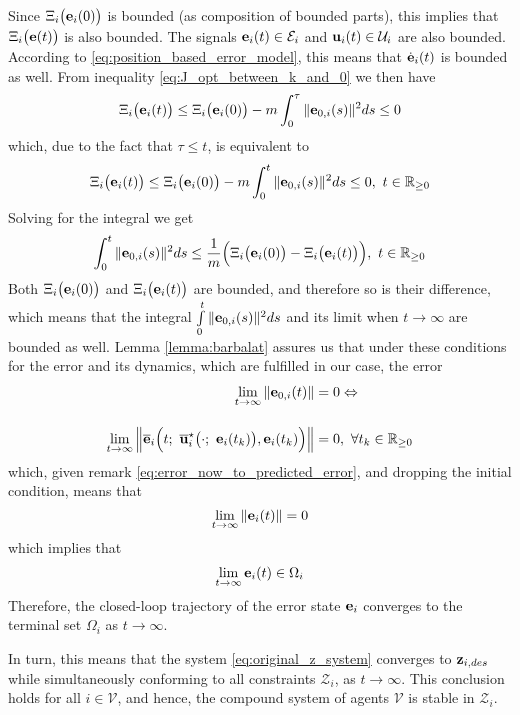 Since $\Xi_i\big(\bm{\mathbf{e}}_i(0)\big)$
is bounded (as composition of bounded parts), this implies
that $\Xi_i\big(\bm{\mathbf{e}}(t)\big)$ is also bounded. The signals
$\bm{\mathbf{e}}_i(t) \in \mathcal{E}_i$ and $\bm{\mathbf{u}}_i(t) \in \mathcal{U}_i$
are also bounded. According to \eqref{eq:position_based_error_model}, this
means that $\dot{\bm{\mathbf{e}}}_i(t)$ is bounded as well. From inequality
\eqref{eq:J_opt_between_k_and_0} we then have
\begin{align}
  \Xi_i\big(\bm{\mathbf{e}}_i(t)\big) \leq \Xi_i\big(\bm{\mathbf{e}}_i(0)\big)
    -m \int_{0}^{\tau} \|\bm{\mathbf{e}}_{0,i}(s)\|^2 ds \leq 0
\end{align}
which, due to the fact that $\tau \leq t$, is equivalent to
\begin{align}
  \Xi_i\big(\bm{\mathbf{e}}_i(t)\big) \leq \Xi_i\big(\bm{\mathbf{e}}_i(0)\big) -m \int_{0}^{t} \|\bm{\mathbf{e}}_{0,i}(s)\|^2 ds \leq 0,\ t \in \mathbb{R}_{\geq 0}
\end{align}
Solving for the integral we get
\begin{align}
  \int_{0}^{t} \|\bm{\mathbf{e}}_{0,i}(s)\|^2 ds \leq
    \dfrac{1}{m}\Big(\Xi_i\big(\bm{\mathbf{e}}_i(0)\big) - \Xi_i\big(\bm{\mathbf{e}}_i(t)\big)\Big),\ t \in \mathbb{R}_{\geq 0}
\end{align}
Both $\Xi_i\big(\bm{\mathbf{e}}_i(0)\big)$ and $\Xi_i\big(\bm{\mathbf{e}}_i(t)\big)$
are bounded, and therefore so is their difference, which means that the
integral $\int\limits_{0}^{t} \|\bm{\mathbf{e}}_{0,i}(s)\|^2 ds$ and its limit when
$t \to \infty$ are bounded as well. Lemma \eqref{lemma:barbalat} assures us
that under these conditions for the error and its dynamics, which are
fulfilled in our case, the error
\begin{align}
  \lim\limits_{t \to \infty}\|\vect{e}_{0,i}(t)\| &= 0 \Leftrightarrow \\[2.5ex]
  \lim\limits_{t \to \infty}
  \Big\| \overline{\vect{e}}_i\Big(t;\ \overline{\vect{u}}_i^{\star}\big(\cdot;\ \vect{e}_i(t_k)\big), \vect{e}_i(t_k) \Big) \Big\| &= 0,\
\forall t_k \in \mathbb{R}_{\geq 0}
\end{align}
which, given remark \eqref{eq:error_now_to_predicted_error},
and dropping the initial condition, means that
$$\lim\limits_{t \to \infty}\|\bm{\mathbf{e}}_i(t)\| = 0$$
which implies that
$$\lim\limits_{t \to \infty}\bm{\mathbf{e}}_i(t) \in \Omega_i$$
Therefore, the closed-loop trajectory of the error state $\bm{\mathbf{e}}_i$ converges
to the terminal set $\Omega_i$ as $t \to \infty$.

In turn, this means that the system \eqref{eq:original_z_system} converges
to $\bm{\mathbf{z}}_{i,des}$ while simultaneously conforming to
all constraints $\mathcal{Z}_i$, as $t \to \infty$. This conclusion holds
for all $i \in \mathcal{V}$, and hence, the compound system of agents
$\mathcal{V}$ is stable in $\mathcal{Z}_i$.
\qedsymbol
